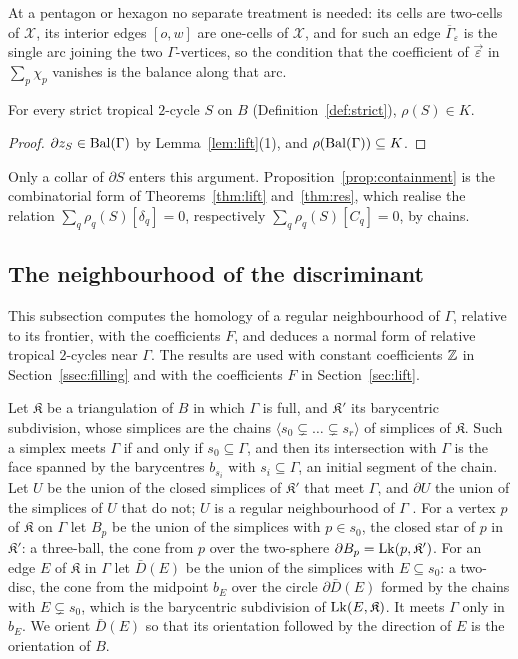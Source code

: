 At a pentagon or hexagon no separate treatment is needed: its cells are two-cells of $\mathcal X$, its interior edges
$[o,w]$ are one-cells of $\mathcal X$, and for such an edge $\overline\Gamma_\varepsilon$ is the single arc joining the
two $\Gamma$-vertices, so the condition that the coefficient of $\vec\varepsilon$ in $\sum_p\chi_p$ vanishes is the
balance along that arc.

\begin{proposition}[containment]\label{prop:containment}
For every strict tropical $2$-cycle $S$ on $B$ (Definition~\ref{def:strict}), $\rho(S)\in K$.
\end{proposition}

\begin{proof}
$\partial z_S\in\mathrm{Bal}(\Gamma)$ by Lemma~\ref{lem:lift}(1), and $\rho(\mathrm{Bal}(\Gamma))\subseteq K$.
\end{proof}

Only a collar of $\partial S$ enters this argument. Proposition~\ref{prop:containment} is the combinatorial form of
Theorems~\ref{thm:lift} and~\ref{thm:res}, which realise the relation $\sum_q\rho_q(S)[\delta_q]=0$, respectively
$\sum_q\rho_q(S)[C_q]=0$, by chains.

\subsection{The neighbourhood of the discriminant}\label{ssec:normal}

This subsection computes the homology of a regular neighbourhood of $\Gamma$, relative to its frontier, with the
coefficients $F$, and deduces a normal form of relative tropical $2$-cycles near $\Gamma$. The results are used with
constant coefficients $\mathbb Z$ in Section~\ref{ssec:filling} and with the coefficients $F$ in Section~\ref{sec:lift}.

Let $\mathfrak K$ be a triangulation of $B$ in which $\Gamma$ is full, and $\mathfrak K'$ its barycentric subdivision,
whose simplices are the chains $\langle{s}_0\subsetneq\dots\subsetneq{s}_r\rangle$ of simplices of $\mathfrak K$.
Such a simplex meets $\Gamma$ if and only if ${s}_0\subseteq\Gamma$, and then its intersection with $\Gamma$ is the face
spanned by the barycentres $b_{{s}_i}$ with ${s}_i\subseteq\Gamma$, an initial segment of the chain. Let $U$ be the
union of the closed simplices of $\mathfrak K'$ that meet $\Gamma$, and $\partial U$ the union of the simplices of $U$ that
do not; $U$ is a regular neighbourhood of $\Gamma$ \cite[Ch.~3]{RS}. For a vertex $p$ of $\mathfrak K$ on $\Gamma$ let
$B_p$ be the union of the simplices with $p\in{s}_0$, the closed star of $p$ in $\mathfrak K'$: a three-ball, the cone
from $p$ over the two-sphere $\partial B_p=\operatorname{Lk}(p,\mathfrak K')$. For an edge $E$ of $\mathfrak K$ in $\Gamma$ let
$\bar D(E)$ be the union of the simplices with $E\subseteq{s}_0$: a two-disc, the cone from the midpoint $b_E$ over the
circle $\partial\bar D(E)$ formed by the chains with $E\subsetneq{s}_0$, which is the barycentric subdivision of
$\operatorname{Lk}(E,\mathfrak K)$. It meets $\Gamma$ only in $b_E$. We orient $\bar D(E)$ so that its orientation followed by the
direction of $E$ is the orientation of $B$.

